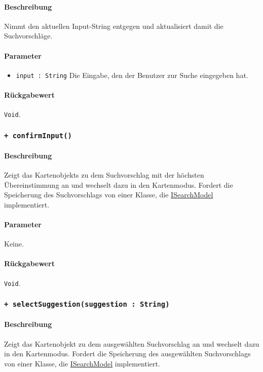 \paragraph*{Beschreibung}
Nimmt den aktuellen Input-String entgegen und aktualisiert damit die Suchvorschläge.
\paragraph*{Parameter}
\begin{itemize}
    \item \texttt{input : String} Die Eingabe, den der Benutzer zur Suche eingegeben hat.
\end{itemize}
\paragraph*{Rückgabewert}
\texttt{Void}.

\subsubsection*{\texttt{+ confirmInput()}}\label{App_Search_ISearchController_confirmInput}%
\paragraph*{Beschreibung}
Zeigt das Kartenobjekts zu dem Suchvorschlag mit der höchsten Übereinstimmung an und wechselt dazu in den Kartenmodus.
Fordert die Speicherung des Suchvorschlags von einer Klasse, die \hyperref[App_Search_ISearchModel]{ISearchModel} implementiert.
\paragraph*{Parameter}
Keine.
\paragraph*{Rückgabewert}
\texttt{Void}.

\subsubsection*{\texttt{+ selectSuggestion(suggestion : String)}}\label{App_Search_ISearchController_selectSuggestion}%
\paragraph*{Beschreibung}
Zeigt das Kartenobjekt zu dem ausgewählten Suchvorschlag an und wechselt dazu in den Kartenmodus.
Fordert die Speicherung des ausgewählten Suchvorschlags von einer Klasse, die \hyperref[App_Search_ISearchModel]{ISearchModel} implementiert.
